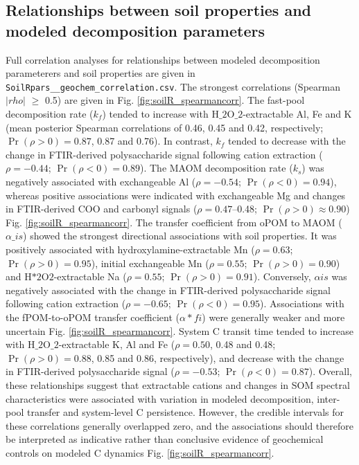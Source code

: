 \documentclass[preprint,12pt]{elsarticle}
\begin{document}
\subsection{Relationships between soil properties and modeled decomposition parameters}
\label{subsec:relationships}
  Full correlation analyses for relationships between modeled decomposition parameterers and soil properties are given in \texttt{SoilRpars\_\_geochem\_correlation.csv}. The strongest correlations (Spearman $|rho|$ $\geq$ 0.5) are given in Fig. \ref{fig:soilR_spearmancorr}.
  The fast-pool decomposition rate ($k_f$) tended to increase with H$\_2$O$\_2$-extractable Al, Fe and K (mean posterior Spearman correlations of 0.46, 0.45 and 0.42, respectively; $\Pr(\rho>0)=0.87$, 0.87 and 0.76). In contrast, $k_f$ tended to decrease with the change in FTIR-derived polysaccharide signal following cation extraction ($\rho=-0.44$; $\Pr(\rho<0)=0.89$). The MAOM decomposition rate ($k_s$) was negatively associated with exchangeable Al ($\rho=-0.54$; $\Pr(\rho<0)=0.94$), whereas positive associations were indicated with exchangeable Mg and changes in FTIR-derived COO and carbonyl signals ($\rho=0.47$--0.48; $\Pr(\rho>0)\approx0.90$) Fig. \ref{fig:soilR_spearmancorr}.
  The transfer coefficient from oPOM to MAOM ($\alpha\_{is}$) showed the strongest directional associations with soil properties. It was positively associated with hydroxylamine-extractable Mn ($\rho=0.63$; $\Pr(\rho>0)=0.95$), initial exchangeable Mn ($\rho=0.55$; $\Pr(\rho>0)=0.90$) and H$*2$O$2$-extractable Na ($\rho=0.55$; $\Pr(\rho>0)=0.91$). Conversely, $\alpha{is}$ was negatively associated with the change in FTIR-derived polysaccharide signal following cation extraction ($\rho=-0.65$; $\Pr(\rho<0)=0.95$). Associations with the fPOM-to-oPOM transfer coefficient ($\alpha*{fi}$) were generally weaker and more uncertain Fig. \ref{fig:soilR_spearmancorr}.
  System C transit time tended to increase with H$\_2$O$\_2$-extractable K, Al and Fe ($\rho=0.50$, 0.48 and 0.48; $\Pr(\rho>0)=0.88$, 0.85 and 0.86, respectively), and decrease with the change in FTIR-derived polysaccharide signal ($\rho=-0.53$; $\Pr(\rho<0)=0.87$). Overall, these relationships suggest that extractable cations and changes in SOM spectral characteristics were associated with variation in modeled decomposition, inter-pool transfer and system-level C persistence. However, the credible intervals for these correlations generally overlapped zero, and the associations should therefore be interpreted as indicative rather than conclusive evidence of geochemical controls on modeled C dynamics Fig. \ref{fig:soilR_spearmancorr}.
\end{document}
